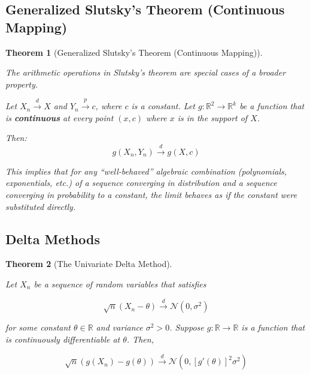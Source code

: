 \documentclass[
  letterpaper,
  DIV=11,
  numbers=noendperiod]{scrreprt}
\renewcommand{\[}{\begin{equation}}
\renewcommand{\]}{\end{equation}}
\theoremstyle{definition}
\theoremstyle{plain}
\theoremstyle{plain}
\theoremstyle{plain}
\newtheorem{theorem}{Theorem}[chapter]
\theoremstyle{definition}
\theoremstyle{plain}
\theoremstyle{remark}
\begin{document}
\subsection{Generalized Slutsky's Theorem (Continuous
Mapping)}\label{generalized-slutskys-theorem-continuous-mapping}

\begin{theorem}[Generalized Slutsky's Theorem (Continuous
Mapping)]\protect\hypertarget{thm-generalized-slutsky}{}\label{thm-generalized-slutsky}

The arithmetic operations in Slutsky's theorem are special cases of a
broader property.

Let \(X_n \xrightarrow{d} X\) and \(Y_n \xrightarrow{p} c\), where \(c\)
is a constant. Let \(g: \mathbb{R}^2 \to \mathbb{R}^k\) be a function
that is \textbf{continuous} at every point \((x, c)\) where \(x\) is in
the support of \(X\).

Then: \[
g(X_n, Y_n) \xrightarrow{d} g(X, c)
\]

This implies that for any ``well-behaved'' algebraic combination
(polynomials, exponentials, etc.) of a sequence converging in
distribution and a sequence converging in probability to a constant, the
limit behaves as if the constant were substituted directly.

\end{theorem}

\subsection{Delta Methods}\label{delta-methods}

\begin{theorem}[The Univariate Delta
Method]\protect\hypertarget{thm-univariate-delta-method}{}\label{thm-univariate-delta-method}

Let \(X_n\) be a sequence of random variables that satisfies

\[ 
\sqrt{n}(X_n - \theta) \xrightarrow{d} \mathcal{N}(0, \sigma^2) 
\]

for some constant \(\theta \in \mathbb{R}\) and variance
\(\sigma^2 > 0\). Suppose \(g: \mathbb{R} \rightarrow \mathbb{R}\) is a
function that is continuously differentiable at \(\theta\). Then,

\[ 
\sqrt{n}(g(X_n) - g(\theta)) \xrightarrow{d} \mathcal{N}(0, [g'(\theta)]^2 \sigma^2) 
\]

\end{theorem}
\end{document}

